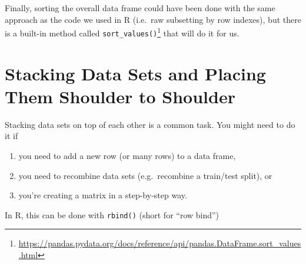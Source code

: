 \documentclass[
  12pt,
  krantz2]{krantz}
\providecommand{\tightlist}{%
  \setlength{\itemsep}{0pt}\setlength{\parskip}{0pt}}
\renewcommand{\href}[2]{#2\footnote{\url{#1}}}
\begin{document}
Finally, sorting the overall data frame could have been done with the same approach as the code we used in R (i.e.~raw subsetting by row indexes), but there is a built-in method called \href{https://pandas.pydata.org/docs/reference/api/pandas.DataFrame.sort_values.html}{\texttt{sort\_values()}} that will do it for us.

\hypertarget{stacking-data-sets-and-placing-them-shoulder-to-shoulder}{%
\section{Stacking Data Sets and Placing Them Shoulder to Shoulder}\label{stacking-data-sets-and-placing-them-shoulder-to-shoulder}}

Stacking data sets on top of each other is a common task. You might need to do it if

\begin{enumerate}
\def\labelenumi{\arabic{enumi}.}
\tightlist
\item
  you need to add a new row (or many rows) to a data frame,
\item
  you need to recombine data sets (e.g.~recombine a train/test split), or
\item
  you're creating a matrix in a step-by-step way.
\end{enumerate}

In R, this can be done with \texttt{rbind()} (short for ``row bind'')
\end{document}
